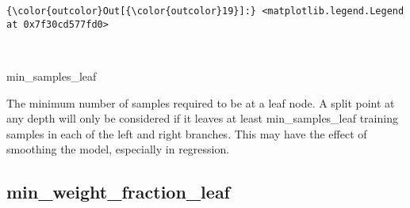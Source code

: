 \documentclass[11pt]{article}
\begin{document}
\begin{Verbatim}[commandchars=\\\{\}]
{\color{outcolor}Out[{\color{outcolor}19}]:} <matplotlib.legend.Legend at 0x7f30cd577fd0>
\end{Verbatim}
            
    \begin{center}
    \end{center}
    { \hspace*{\fill} \\}
    
    min\_samples\_leaf

The minimum number of samples required to be at a leaf node. A split
point at any depth will only be considered if it leaves at least
min\_samples\_leaf training samples in each of the left and right
branches. This may have the effect of smoothing the model, especially in
regression.

    \subsection{min\_weight\_fraction\_leaf}\label{min_weight_fraction_leaf}
\end{document}

